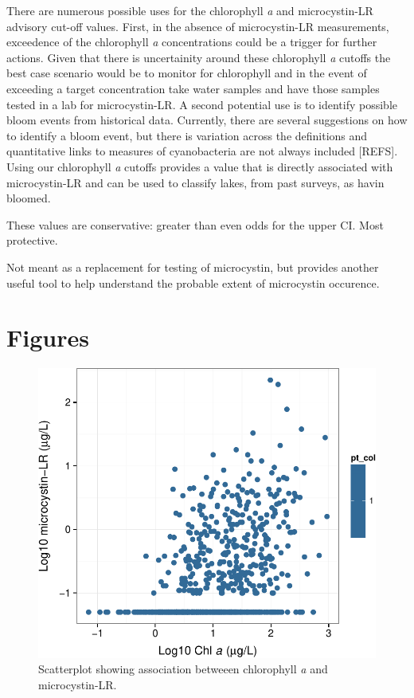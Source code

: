 \documentclass[11pt,]{article}
\begin{document}
There are numerous possible uses for the chlorophyll \emph{a} and
microcystin-LR advisory cut-off values. First, in the absence of
microcystin-LR measurements, exceedence of the chlorophyll \emph{a}
concentrations could be a trigger for further actions. Given that there
is uncertainity around these chlorophyll \emph{a} cutoffs the best case
scenario would be to monitor for chlorophyll and in the event of
exceeding a target concentration take water samples and have those
samples tested in a lab for microcystin-LR. A second potential use is to
identify possible bloom events from historical data. Currently, there
are several suggestions on how to identify a bloom event, but there is
variation across the definitions and quantitative links to measures of
cyanobacteria are not always included {[}REFS{]}. Using our chlorophyll
\emph{a} cutoffs provides a value that is directly associated with
microcystin-LR and can be used to classify lakes, from past surveys, as
havin bloomed.

These values are conservative: greater than even odds for the upper CI.
Most protective.

Not meant as a replacement for testing of microcystin, but provides
another useful tool to help understand the probable extent of
microcystin occurence.

\newpage

\section{Figures}\label{figures}

\begin{figure}[htbp]
\centering
\includegraphics{manuscript_files/figure-latex/chla_micro_scatter-1.pdf}
\caption{Scatterplot showing association betweeen chlorophyll \textit{a}
and microcystin-LR. \label{fig:chla_micro_scatter}}
\end{figure}
\end{document}
